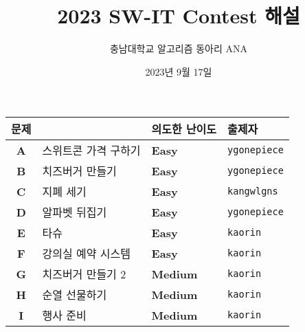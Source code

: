 
\usetikzlibrary{arrows.meta,matrix,decorations.pathreplacing}

\title{2023 SW-IT Contest 해설}
\author{충남대학교 알고리즘 동아리 ANA}
\date{2023년 9월 17일}


    \setcounter{framenumber}{-1}
    \frame{\titlepage}
        
    \begin{frame}
        \begin{center}
            \begin{tabular}{cl|l|l}
                \hline
                문제 & & 의도한 난이도 & 출제자 \\
                \hline
                \hline
                \textbf{A} & 스위트콘 가격 구하기& \textbf{\color{acbronze}Easy} & \texttt{ygonepiece} \\
                \textbf{B} & 치즈버거 만들기 & \textbf{\color{acbronze}Easy} & \texttt{ygonepiece} \\
                \textbf{C} & 지폐 세기 & \textbf{\color{acbronze}Easy} & \texttt{kangwlgns} \\
                \textbf{D} & 알파벳 뒤집기 & \textbf{\color{acbronze}Easy} & \texttt{ygonepiece} \\
                \textbf{E} & 타슈 & \textbf{\color{acbronze}Easy} & \texttt{kaorin} \\
                \textbf{F} & 강의실 예약 시스템 & \textbf{\color{acsilver}Easy} & \texttt{kaorin} \\
                \textbf{G} & 치즈버거 만들기 2 & \textbf{\color{acsilver}Medium} & \texttt{kaorin} \\
                \textbf{H} & 순열 선물하기 & \textbf{\color{acsilver}Medium} & \texttt{kaorin} \\
                \textbf{I} & 행사 준비 & \textbf{\color{acgold}Medium} & \texttt{kaorin} \\
                \hline
            \end{tabular}
        \end{center}
    \end{frame}

